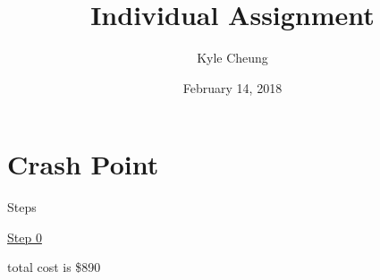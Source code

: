 \documentclass{article}
\title{Individual Assignment}
\date{February 14, 2018}
\author{Kyle Cheung}
\begin{document}
\maketitle
\newpage
{}

\section{Crash Point}
Steps

\underline{Step 0}

total cost is \$890
\end{document}
